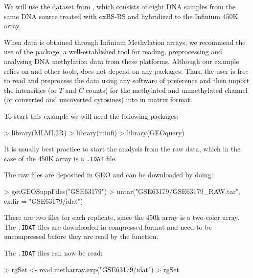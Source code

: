 \documentclass{article}
\begin{document}
We will use the dataset from \cite{10.1371/journal.pone.0118202}, which consists of eight DNA samples from the same DNA source treated with oxBS-BS and hybridized to the Infinium 450K array.

When data is obtained through Infinium Methylation arrays, we recommend the use of the  package, a well-established tool for reading, preprocessing and analysing DNA methylation data from these platforms. Although our example relies on  and other \Bioconductor{} tools,  does not depend on any packages. Thus, the user is free to read and preprocess the data using any software of preference and then import the intensities (or $T$ and $C$ counts) for the methylated and unmethylated channel (or converted and uncoverted cytosines) into \R{} in matrix format.

To start this example we will need the following packages:
\begin{Schunk}
\begin{Sinput}
> library(MLML2R)
> library(minfi)
> library(GEOquery)
\end{Sinput}
\end{Schunk}

It is usually best practice to start the analysis from the raw data, which in the case of the 450K array is a \verb|.IDAT| file.

The raw files are deposited in GEO and can be downloaded by doing:
\begin{Schunk}
\begin{Sinput}
> getGEOSuppFiles("GSE63179")
> untar("GSE63179/GSE63179_RAW.tar", exdir = "GSE63179/idat")
\end{Sinput}
\end{Schunk}

There are two files for each replicate, since the 450k array is a two-color array. The \verb|.IDAT| files are downloaded in compressed format and need to be uncompressed before they are read by the  function.
\begin{Schunk}
\end{Schunk}

The \verb|.IDAT| files can now be read:
\begin{Schunk}
\begin{Sinput}
> rgSet <- read.metharray.exp("GSE63179/idat")
> rgSet
\end{Sinput}
\end{Schunk}
\end{document}

